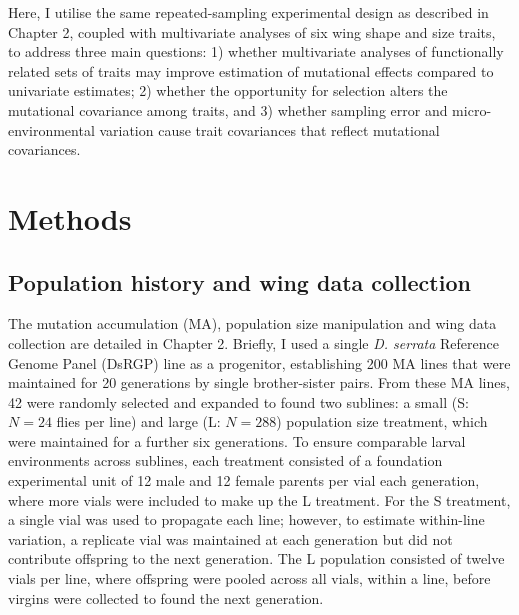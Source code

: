Here, I utilise the same repeated-sampling experimental design as described in Chapter 2, coupled with multivariate analyses of six wing shape and size traits, to address three main questions: 1) whether multivariate analyses of functionally related sets of traits may improve estimation of mutational effects compared to univariate estimates; 2) whether the opportunity for selection alters the mutational covariance among traits, and 3) whether sampling error and micro-environmental variation cause trait covariances that reflect mutational covariances. \par

\vfill

\section{Methods}
\subsection{Population history and wing data collection}
The mutation accumulation (MA), population size manipulation and wing data collection are detailed in Chapter 2. Briefly, I used a single \textit{D. serrata} Reference Genome Panel (DsRGP) line \citep{Redd18} as a progenitor, establishing 200 MA lines that were maintained for 20 generations by single brother-sister pairs. From these MA lines, 42 were randomly selected and expanded to found two sublines: a small (S: $N = 24$ flies per line) and large (L: $N = 288$) population size treatment, which were maintained for a further six generations. To ensure comparable larval environments across sublines, each treatment consisted of a foundation experimental unit of 12 male and 12 female parents per vial each generation, where more vials were included to make up the L treatment. For the S treatment, a single vial was used to propagate each line; however, to estimate within-line variation, a replicate vial was maintained at each generation but did not contribute offspring to the next generation. The L population consisted of twelve vials per line, where offspring were pooled across all vials, within a line, before virgins were collected to found the next generation.\par

